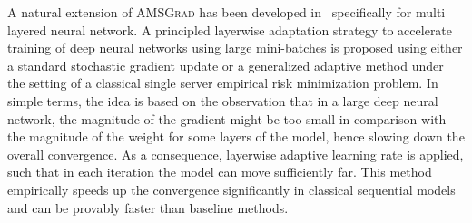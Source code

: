 \documentclass[11pt]{article}
\begin{document}


A natural extension of \textsc{AMSGrad} has been developed in~\citep{you2019large} specifically for multi layered neural network. 
A principled layerwise adaptation strategy to accelerate training of deep neural networks using large mini-batches is proposed using either a standard stochastic gradient update or a generalized adaptive method under the setting of a classical single server empirical risk minimization problem. 
 In simple terms, the idea is based on the observation that in a large deep neural network, the magnitude of the gradient might be too small in comparison with the magnitude of the weight for some layers of the model, hence slowing down the overall convergence. 
As a consequence, layerwise adaptive learning rate is applied, such that in each iteration the model can move sufficiently far. 
This method empirically speeds up the convergence significantly in classical sequential models and can be provably faster than baseline methods.


\vspace{0.05in}
\end{document}
